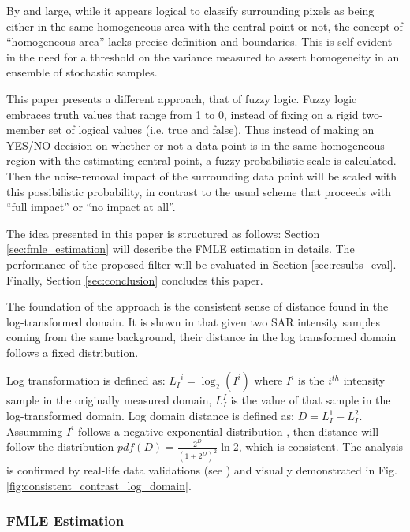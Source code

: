 By and large, while it appears logical to classify surrounding pixels as being either in the same homogeneous area with the central point or not,
  the concept of ``homogeneous area'' lacks precise definition and boundaries.
This is self-evident in the need for a threshold on the variance measured to assert homogeneity in an ensemble of stochastic samples.

This paper presents a different approach, that of fuzzy logic.
Fuzzy logic embraces truth values that range from 1 to 0, 
	instead of fixing on a rigid two-member set of logical values (i.e. true and false).
Thus instead of making an YES/NO decision on whether or not a data point is in the same homogeneous region with the estimating central point, a fuzzy probabilistic scale is calculated.
Then the noise-removal impact of the surrounding data point will be scaled with this possibilistic probability, in contrast to the usual scheme that proceeds with ``full impact'' or ``no impact at all''.

The idea presented in this paper is structured as follows:
Section \ref{sec:fmle_estimation} will describe the FMLE estimation in details.
The performance of the proposed filter will be evaluated in Section \ref{sec:results_eval}.
Finally, Section \ref{sec:conclusion} concludes this paper.

The foundation of the approach is the consistent sense of distance found in the log-transformed domain.
It is shown in \cite{Le_2010_ACRS} that given two SAR intensity samples coming from the same background, their distance in the log transformed domain follows a fixed distribution.

Log transformation is defined as:
${L_I}^i = \log_2{(I^i)}$ 
where 
	$I^i$ is the \textit{$i^{th}$} intensity sample in the originally measured domain,
	$L_I^I$ is the value of that sample in the log-transformed domain.
Log domain distance is defined as:
$D= L_I^1 - L_I^2$. 
Assumming $I^i$ follows a negative exponential distribution \citep{Goodman_JOptSocAm_76}, 
  then distance will follow the distribution 
$pdf(D)= \frac{2^D}{(1+2^D)^2} \ln2$,
  which is consistent.
The analysis is confirmed by real-life data validations (see \cite{Le_2010_ACRS}) and visually demonstrated in Fig. \ref{fig:consistent_contrast_log_domain}.

\subsubsection{FMLE Estimation}

